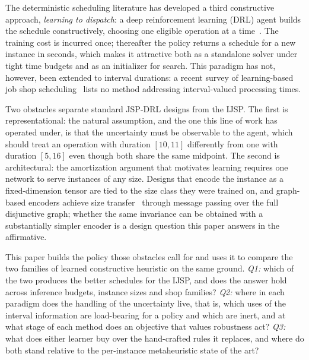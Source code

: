\documentclass[preprint,authoryear,12pt]{elsarticle}
\theoremstyle{definition}
\theoremstyle{remark}
\begin{document}
The deterministic scheduling literature has developed a third
constructive approach, \emph{learning to dispatch}: a deep
reinforcement learning (DRL) agent builds the schedule constructively,
choosing one eligible operation at a
time~\citep{Zhang2020L2D,Park2021GNN,Tassel2021}. The
training cost is incurred once; thereafter the policy returns a
schedule for a new instance in seconds, which makes it attractive both
as a standalone solver under tight time budgets and as an initializer
for search. This paradigm has not, however, been extended to interval
durations: a recent survey of
learning-based job shop scheduling~\citep{Xu2025} lists no method
addressing interval-valued processing times.

Two obstacles separate standard JSP-DRL designs from the IJSP.
The first is representational: the natural assumption, and the one
this line of work has operated under, is that the uncertainty must be
observable to the agent, which should treat an operation with
duration $[10,11]$ differently from one with duration $[5,16]$ even
though both share the same midpoint. The second is
architectural: the amortization argument that motivates learning
requires one network to serve instances of any size. Designs that
encode the instance as a fixed-dimension tensor are tied to the size
class they were trained on, and graph-based encoders achieve size
transfer~\citep{Zhang2020L2D,Park2021GNN} through message passing
over the full disjunctive graph; whether the same invariance can be
obtained with a substantially simpler encoder is a design question
this paper answers in the affirmative.

This paper builds the policy those obstacles call for and uses it to
compare the two families of learned constructive heuristic on the same
ground. \emph{Q1:} which of the two produces the better schedules for
the IJSP, and does the answer hold across inference budgets, instance
sizes and shop families? \emph{Q2:} where in each paradigm does the
handling of the uncertainty live, that is, which uses of the interval
information are load-bearing for a policy and which are inert, and at
what stage of each method does an objective that values robustness
act? \emph{Q3:} what does either learner buy over the hand-crafted
rules it replaces, and where do both stand relative to the
per-instance metaheuristic state of the art?
\end{document}
